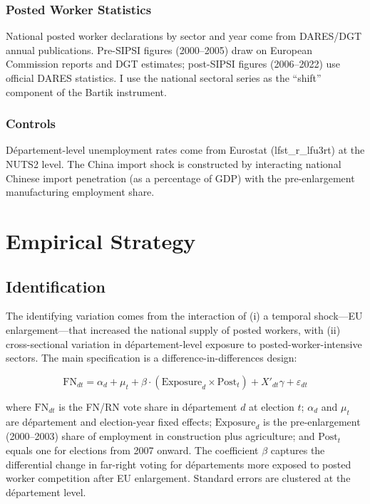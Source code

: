 \documentclass[12pt]{article}
\begin{document}
\subsubsection*{Posted Worker Statistics} National posted worker declarations by sector and year come from DARES/DGT annual publications. Pre-SIPSI figures (2000--2005) draw on European Commission reports and DGT estimates; post-SIPSI figures (2006--2022) use official DARES statistics. I use the national sectoral series as the ``shift'' component of the Bartik instrument.

\subsubsection*{Controls} D\'epartement-level unemployment rates come from Eurostat (lfst\_r\_lfu3rt) at the NUTS2 level. The China import shock is constructed by interacting national Chinese import penetration (as a percentage of GDP) with the pre-enlargement manufacturing employment share.



\section{Empirical Strategy}

\subsection{Identification}

The identifying variation comes from the interaction of (i) a temporal shock---EU enlargement---that increased the national supply of posted workers, with (ii) cross-sectional variation in d\'epartement-level exposure to posted-worker-intensive sectors. The main specification is a difference-in-differences design:

\begin{equation}
\text{FN}_{dt} = \alpha_d + \mu_t + \beta \cdot (\text{Exposure}_d \times \text{Post}_t) + X'_{dt}\gamma + \varepsilon_{dt}
\label{eq:main}
\end{equation}

\noindent where $\text{FN}_{dt}$ is the FN/RN vote share in d\'epartement $d$ at election $t$; $\alpha_d$ and $\mu_t$ are d\'epartement and election-year fixed effects; $\text{Exposure}_d$ is the pre-enlargement (2000--2003) share of employment in construction plus agriculture; and $\text{Post}_t$ equals one for elections from 2007 onward. The coefficient $\beta$ captures the differential change in far-right voting for d\'epartements more exposed to posted worker competition after EU enlargement. Standard errors are clustered at the d\'epartement level.
\end{document}

